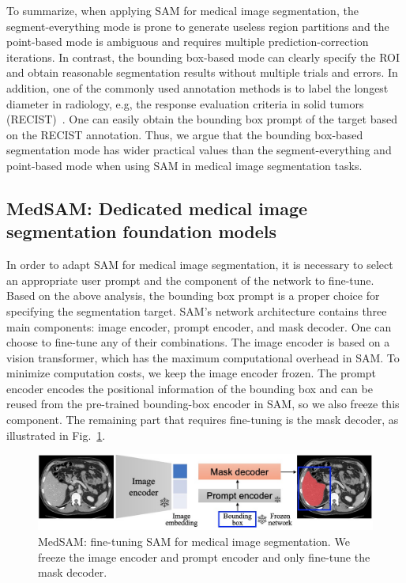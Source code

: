 \documentclass[runningheads]{llncs}
\begin{document}
To summarize, when applying SAM for medical image segmentation, the segment-everything mode is prone to generate useless region partitions and the point-based mode is ambiguous and requires multiple prediction-correction iterations. In contrast, the bounding box-based mode can clearly specify the ROI and obtain reasonable segmentation results without multiple trials and errors. In addition, one of the commonly used annotation methods is to label the longest diameter in radiology, e.g, the response evaluation criteria in solid tumors (RECIST)~\cite{RECIST09}. One can easily obtain the bounding box prompt of the target based on the RECIST annotation. Thus, we argue that the bounding box-based segmentation mode has wider practical values than the segment-everything and point-based mode when using SAM in medical image segmentation tasks.

\subsection{MedSAM: Dedicated medical image segmentation foundation models}
In order to adapt SAM for medical image segmentation, it is necessary to select an appropriate user prompt and the component of the network to fine-tune. 
Based on the above analysis, the bounding box prompt is a proper choice for specifying the segmentation target. SAM's network architecture contains three main components: image encoder, prompt encoder, and mask decoder. One can choose to fine-tune any of their combinations. The image encoder is based on a vision transformer, which has the maximum computational overhead in SAM. 
To minimize computation costs, we keep the image encoder frozen. 
The prompt encoder encodes the positional information of the bounding box and can be reused from the pre-trained bounding-box encoder in SAM, so we also freeze this component. The remaining part that requires fine-tuning is the mask decoder, as illustrated in Fig.~\ref{fig:medsam}. 

\begin{figure}[htbp]
\centering
\includegraphics[scale=0.3]{imgs/fig3-MedSAM.png}
\caption{MedSAM: fine-tuning SAM for medical image segmentation. We freeze the image encoder and prompt encoder and only fine-tune the mask decoder.}
\label{fig:medsam}
\end{figure}
\end{document}
